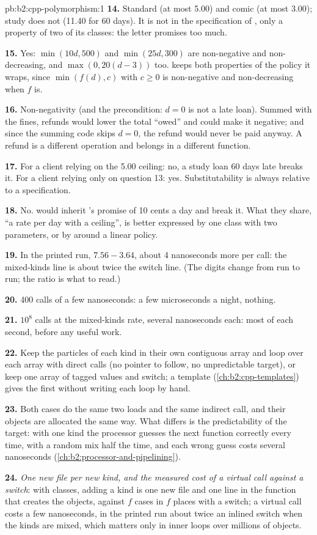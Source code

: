\begin{solution}{pb:b2:cpp-polymorphism:1}
\textbf{14.} Standard (at most 5.00) and comic (at most 3.00); study does not (11.40 for 60 days). It is not in the
specification of , only a property of two of its classes: the letter promises too much.

\textbf{15.} Yes: $\min(10d, 500)$ and $\min(25d, 300)$ are non-negative and non-decreasing, and
$\max(0, 20(d-3))$ too.  keeps both properties of the policy it wraps, since $\min(f(d), c)$ with $c
\geq 0$ is non-negative and non-decreasing when $f$ is.

\textbf{16.} Non-negativity (and the precondition: $d = 0$ is not a late loan). Summed with the fines, refunds would
lower the total ``owed'' and could make it negative; and since the summing code skips $d = 0$, the refund would never
be paid anyway. A refund is a different operation and belongs in a different function.

\textbf{17.} For a client relying on the 5.00 ceiling: no, a study loan 60 days late breaks it. For a client relying
only on question 13: yes. Substitutability is always relative to a specification.

\textbf{18.} No.  would inherit 's promise of 10 cents a day and break it. What
they share, ``a rate per day with a ceiling'', is better expressed by one class with two parameters, or by
 around a linear policy.

\textbf{19.} In the printed run, $7.56 - 3.64$, about 4 nanoseconds more per call: the mixed-kinds line is about
twice the switch line. (The digits change from run to run; the ratio is what to read.)

\textbf{20.} 400 calls of a few nanoseconds: a few microseconds a night, nothing.

\textbf{21.} $10^8$ calls at the mixed-kinds rate, several nanoseconds each: most of each second, before any useful work.

\textbf{22.} Keep the particles of each kind in their own contiguous array and loop over each array with direct
calls (no pointer to follow, no unpredictable target), or keep one array of tagged values and switch; a template
(\cref{ch:b2:cpp-templates}) gives the first without writing each loop by hand.

\textbf{23.} Both cases do the same two loads and the same indirect call, and their objects are allocated the same
way. What differs is the predictability of the target: with one kind the processor guesses the next function
correctly every time, with a random mix half the time, and each wrong guess costs several nanoseconds
(\cref{ch:b2:processor-and-pipelining}).

\textbf{24.} \emph{One new file per new kind, and the measured cost of a virtual call against a switch}: with
classes, adding a kind is one new file and one line in the function that creates the objects, against $f$ cases in
$f$ places with a switch; a virtual call costs a few nanoseconds, in the printed run about twice an inlined switch
when the kinds are mixed, which matters only in inner loops over millions of objects.
\end{solution}
